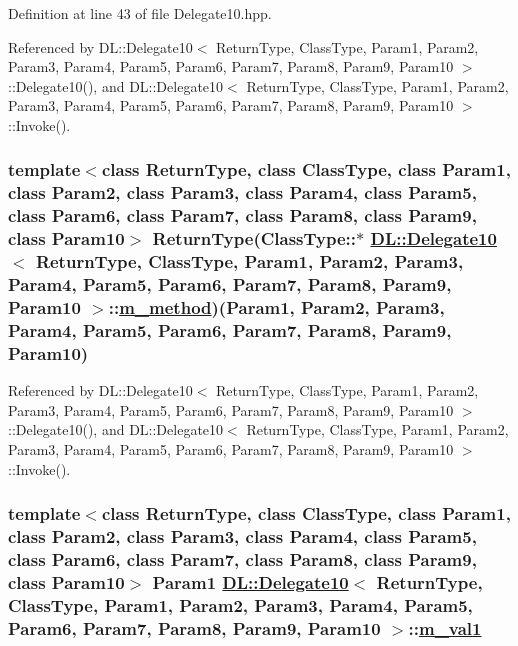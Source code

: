 Definition at line 43 of file Delegate10.hpp.

Referenced by DL::Delegate10$<$ Return\-Type, Class\-Type, Param1, Param2, Param3, Param4, Param5, Param6, Param7, Param8, Param9, Param10 $>$::Delegate10(), and DL::Delegate10$<$ Return\-Type, Class\-Type, Param1, Param2, Param3, Param4, Param5, Param6, Param7, Param8, Param9, Param10 $>$::Invoke().\hypertarget{classDL_1_1Delegate10_r1}{
\subsubsection[m\_\-method]{\setlength{\rightskip}{0pt plus 5cm}template$<$class Return\-Type, class Class\-Type, class Param1, class Param2, class Param3, class Param4, class Param5, class Param6, class Param7, class Param8, class Param9, class Param10$>$ Return\-Type(Class\-Type::$\ast$ \hyperlink{classDL_1_1Delegate10}{DL::Delegate10}$<$ Return\-Type, Class\-Type, Param1, Param2, Param3, Param4, Param5, Param6, Param7, Param8, Param9, Param10 $>$::\hyperlink{classDL_1_1Delegate10_r1}{m\_\-method})(Param1, Param2, Param3, Param4, Param5, Param6, Param7, Param8, Param9, Param10)}}
\label{classDL_1_1Delegate10_r1}




Referenced by DL::Delegate10$<$ Return\-Type, Class\-Type, Param1, Param2, Param3, Param4, Param5, Param6, Param7, Param8, Param9, Param10 $>$::Delegate10(), and DL::Delegate10$<$ Return\-Type, Class\-Type, Param1, Param2, Param3, Param4, Param5, Param6, Param7, Param8, Param9, Param10 $>$::Invoke().\hypertarget{classDL_1_1Delegate10_r2}{
\subsubsection[m\_\-val1]{\setlength{\rightskip}{0pt plus 5cm}template$<$class Return\-Type, class Class\-Type, class Param1, class Param2, class Param3, class Param4, class Param5, class Param6, class Param7, class Param8, class Param9, class Param10$>$ Param1 \hyperlink{classDL_1_1Delegate10}{DL::Delegate10}$<$ Return\-Type, Class\-Type, Param1, Param2, Param3, Param4, Param5, Param6, Param7, Param8, Param9, Param10 $>$::\hyperlink{classDL_1_1Delegate10_r2}{m\_\-val1}}}
\label{classDL_1_1Delegate10_r2}




